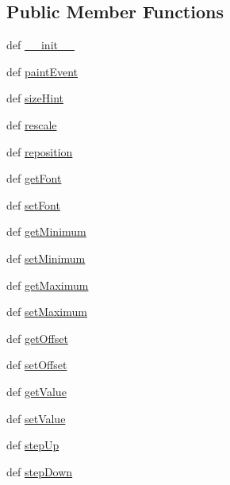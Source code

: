 \subsection*{Public Member Functions}
\begin{DoxyCompactItemize}
\item 
def \hyperlink{classcounterlabel_1_1CounterLabel_ad12af280e6565418895d7f8a65da785c}{\+\_\+\+\_\+init\+\_\+\+\_\+}
\item 
def \hyperlink{classcounterlabel_1_1CounterLabel_a09f8e0d7d28c68fc5b2ad88e747e4f3b}{paint\+Event}
\item 
def \hyperlink{classcounterlabel_1_1CounterLabel_ae41703ce47ef1e40288d67c07c2624be}{size\+Hint}
\item 
def \hyperlink{classcounterlabel_1_1CounterLabel_af266083c764568a6d8a731de3ac115bb}{rescale}
\item 
def \hyperlink{classcounterlabel_1_1CounterLabel_a8f2fe4e931d8a8e672ffa6692f60f71a}{reposition}
\item 
def \hyperlink{classcounterlabel_1_1CounterLabel_aea3cbf01dcee194e2ac891701b4d8d46}{get\+Font}
\item 
def \hyperlink{classcounterlabel_1_1CounterLabel_ad2cf614d90cdd00fdf3dfe3ce1b1049f}{set\+Font}
\item 
def \hyperlink{classcounterlabel_1_1CounterLabel_a941373cf7e9c62d47c48654c0065e22f}{get\+Minimum}
\item 
def \hyperlink{classcounterlabel_1_1CounterLabel_ac1c15fa5b6661a9727bd3cae19ef23df}{set\+Minimum}
\item 
def \hyperlink{classcounterlabel_1_1CounterLabel_a5237df8853658ca7d62448c57b6722fb}{get\+Maximum}
\item 
def \hyperlink{classcounterlabel_1_1CounterLabel_acde9ac8afaca63af9091b644fb83f392}{set\+Maximum}
\item 
def \hyperlink{classcounterlabel_1_1CounterLabel_ac41b479286aa2357809ce1b4770124cf}{get\+Offset}
\item 
def \hyperlink{classcounterlabel_1_1CounterLabel_a6a158fb27240367b213ee366d032f41b}{set\+Offset}
\item 
def \hyperlink{classcounterlabel_1_1CounterLabel_adb94f2fbf3b77a3e2aa95e308caa6548}{get\+Value}
\item 
def \hyperlink{classcounterlabel_1_1CounterLabel_ab05b11305da39e15a9e7a533617395ef}{set\+Value}
\item 
def \hyperlink{classcounterlabel_1_1CounterLabel_a88286f5bc8e9b60a4e672b8ec7991b0a}{step\+Up}
\item 
def \hyperlink{classcounterlabel_1_1CounterLabel_ad1486a630fe9566f57aa2751e0bd30fd}{step\+Down}
\end{DoxyCompactItemize}
